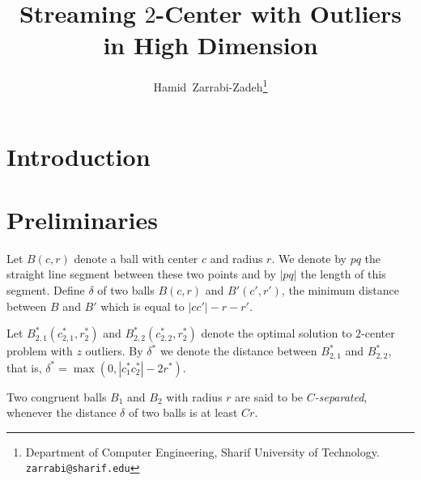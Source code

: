 \documentclass[envcountsame]{cls/cccg15}
\title{Streaming $2$-Center with Outliers in High Dimension}
\author{Hamid~Zarrabi-Zadeh\thanks{Department of Computer Engineering, 
	Sharif University of Technology. 
	{\tt zarrabi@sharif.edu}}
	\and 
}
\newcommand{\card}[1]{\left|{#1}\right|}
\begin{document}
\maketitle
\pagestyle{plain}


\begin{abstract}

\end{abstract}


\section{Introduction}






\section{Preliminaries}
\label{sec:pre}
Let $B(c,r)$ denote a ball with center $c$ and radius $r$. We denote by $pq$ the straight line segment between these two points and by $\card{pq}$ the length of this segment. 
Define $\delta$ of two balls $B(c,r)$ and $B'(c',r')$, the minimum distance between $B$ and $B'$ which is equal to $\card{cc'}-r-r'$.

Let $B_{2,1}^*(c_{2,1}^*, r_2^*)$ and $B_{2,2}^*(c_{2,2}^*, r_2^*)$ denote the optimal solution to $2$-center problem with $z$ outliers. By $\delta^*$ we denote the distance between $B_{2,1}^*$ and $B_{2,2}^*$, that is, $\delta^* = \max (0, \card{c_1^*c_2^*} - 2r^*)$. 

Two congruent balls $B_1$ and $B_2$ with radius $r$ are said to be \emph{$C$-separated}, whenever the distance $\delta$ of two balls is at least $Cr$.

\end{document}
